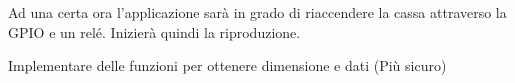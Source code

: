 \begin{DoxyRefList}
\-Ad una certa ora l'applicazione sarà in grado di riaccendere la cassa attraverso la \-G\-P\-I\-O e un relé. \-Inizierà quindi la riproduzione.  
\item[\label{todo__todo000002}%
\hypertarget{todo__todo000002}{}%
\-Membro \hyperlink{classusbData_ab0a9963ce896605e7e988e01e6efe1ba}{usb\-Data\-:\-:elementi} ]\-Implementare delle funzioni per ottenere dimensione e dati (\-Più sicuro) 
\end{DoxyRefList}